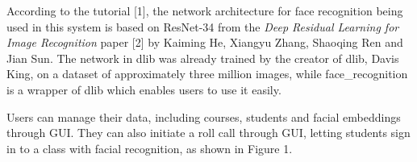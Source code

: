 \documentclass[14pt]{report}
\begin{document}
According to the tutorial [1], the network architecture for face recognition being used in this system 
is based on ResNet-34 from the \textit {Deep Residual Learning for Image Recognition} paper [2] by Kaiming He, 
Xiangyu Zhang, Shaoqing Ren and Jian Sun. The network in dlib was already trained by the creator of dlib,
Davis King, on a dataset of approximately three million images, while face\_recognition is a wrapper of
dlib which enables users to use it easily.
\newline

Users can manage their data, including courses, students and facial embeddings through GUI. They can also 
initiate a roll call through GUI, letting students sign in to a class with facial recognition, as shown in
Figure 1.
\newline
\end{document}
